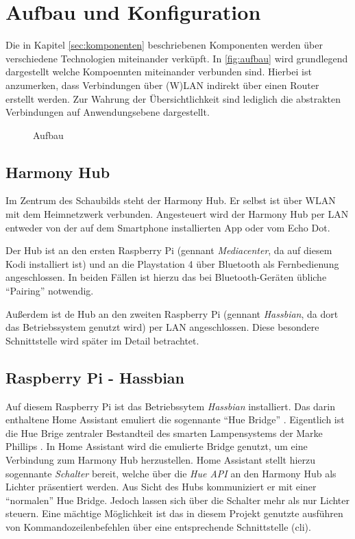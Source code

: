 \section{Aufbau und Konfiguration}\label{sec:aufbau}
Die in Kapitel \ref{sec:komponenten} \textit{} beschriebenen Komponenten werden über verschiedene Technologien miteinander verküpft.
In \autoref{fig:aufbau} wird grundlegend dargestellt welche Kompoennten miteinander verbunden sind.
Hierbei ist anzumerken, dass Verbindungen über (W)LAN indirekt über einen Router erstellt werden.
Zur Wahrung der Übersichtlichkeit sind lediglich die abstrakten Verbindungen auf Anwendungsebene dargestellt.

\begin{figure}[ht!]
    \centering
    \resizebox{\textwidth}{!}{
        
    }
    \caption{Aufbau}
    \label{fig:aufbau}
\end{figure}

\subsection{Harmony Hub}\label{sec:aufbau-hub}
Im Zentrum des Schaubilds steht der Harmony Hub.
Er selbst ist über WLAN mit dem Heimnetzwerk verbunden.
Angesteuert wird der Harmony Hub per LAN entweder von der auf dem Smartphone installierten App oder vom Echo Dot.

Der Hub ist an den ersten Raspberry Pi (gennant \textit{Mediacenter}, da auf diesem Kodi installiert ist)
und an die Playstation 4 über Bluetooth als Fernbedienung angeschlossen.
In beiden Fällen ist hierzu das bei Bluetooth-Geräten übliche \enquote{Pairing} notwendig.

Außerdem ist de Hub an den zweiten Raspberry Pi (gennant \textit{Hassbian}, da dort das Betriebssystem genutzt wird) per LAN angeschlossen.
Diese besondere Schnittstelle wird später im Detail betrachtet.

\subsection{Raspberry Pi - Hassbian}\label{sec:aufbau-hassbian}
Auf diesem Raspberry Pi ist das Betriebssytem \textit{Hassbian} installiert.
Das darin enthaltene Home Assistant emuliert die sogennante \enquote{Hue Bridge} \cite{Emulated83:online}.
Eigentlich ist die Hue Brige zentraler Bestandteil des smarten Lampensystems der Marke Phillips \cite{HueBridg65:online}.
In Home Assistant wird die emulierte Bridge genutzt, um eine Verbindung zum Harmony Hub herzustellen.
Home Assistant stellt hierzu sogennante \textit{Schalter} bereit, welche über die \textit{Hue API} an den Harmony Hub als Lichter präsentiert werden.
Aus Sicht des Hubs kommuniziert er mit einer \enquote{normalen} Hue Bridge.
Jedoch lassen sich über die Schalter mehr als nur Lichter steuern.
Eine mächtige Möglichkeit ist das in diesem Projekt genutzte ausführen von Kommandozeilenbefehlen über eine entsprechende Schnittstelle (\ac{cli}).

